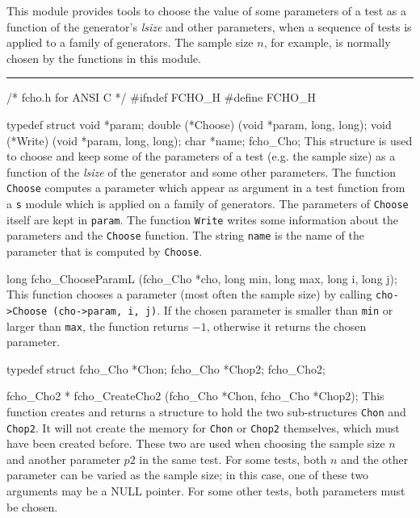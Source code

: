 
This module provides tools to choose the value of some parameters of a
test as a function of the generator's {\it lsize} and other parameters,
when a sequence of tests is applied to a family of generators.
The sample size $n$, for example, is normally chosen by the functions
in this module.

\bigskip
\hrule
\code\hide
/* fcho.h for ANSI C */
#ifndef FCHO_H
#define FCHO_H
\endhide
\endcode




\code

typedef struct {
   void *param;
   double (*Choose) (void *param, long, long);
   void (*Write) (void *param, long, long);
   char *name;
} fcho_Cho;
\endcode
 \tab This structure is used to choose and keep some of the parameters of a
  test (e.g. the sample size) as a function of the {\it lsize} of the
  generator and some other parameters. The function  {\tt Choose} computes
  a parameter which appear as
  argument in a test function from a {\tt s} module which is applied
  on a family of generators. The parameters of {\tt Choose} itself are kept
  in {\tt param}. The function  {\tt Write} writes some information about
  the parameters and the  {\tt Choose} function. The string {\tt name}
  is the name of the parameter that is computed by {\tt Choose}.
\endtab
\code


long fcho_ChooseParamL (fcho_Cho *cho, long min, long max, long i, long j);
\endcode
\tab This function chooses a  parameter (most often the sample
size) by calling {\tt  cho->Choose (cho->param, i, j)}. If the chosen
parameter is smaller than {\tt min} or larger than {\tt max}, the function
returns $-1$, otherwise it returns the chosen parameter.
\endtab





\code

typedef struct {
   fcho_Cho *Chon;
   fcho_Cho *Chop2;
} fcho_Cho2;
\endcode
 \tab
 \endtab
\code


fcho_Cho2 * fcho_CreateCho2 (fcho_Cho *Chon, fcho_Cho *Chop2);
\endcode
 \tab 
  This function creates and returns a structure to hold the two
  sub-structures {\tt Chon} and {\tt Chop2}. It will not create the memory
  for {\tt Chon} or {\tt Chop2} themselves, which must have been created
  before. These two are used when choosing the sample size $n$ and another
  parameter $p2$ in the same test. For some tests, both $n$ and the other
  parameter can be varied as the sample size; in this case, one of these
  two arguments may be a NULL pointer. For some other tests, both
  parameters must be chosen.
 \endtab
\code


